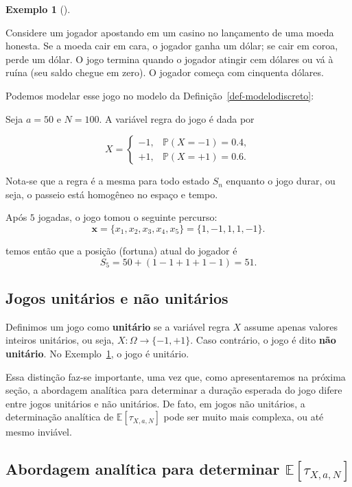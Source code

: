 \documentclass[
  brazilian,
  12pt,
]{article}
\theoremstyle{definition}
\newtheorem{example}{Exemplo}[section]
\theoremstyle{definition}
\theoremstyle{remark}
\begin{document}
\begin{example}[]\protect\hypertarget{exm-modelodiscreto}{}\label{exm-modelodiscreto}

Considere um jogador apostando em um casino no lançamento de uma moeda
honesta. Se a moeda cair em cara, o jogador ganha um dólar; se cair em
coroa, perde um dólar. O jogo termina quando o jogador atingir cem
dólares ou vá à ruína (seu saldo chegue em zero). O jogador começa com
cinquenta dólares.

Podemos modelar esse jogo no modelo da
Definição~\ref{def-modelodiscreto}:

Seja \(a = 50\) e \(N = 100\). A variável regra do jogo é dada por

\[
X = \begin{cases}
-1, & \mathbb{P}(X = -1) = 0.4, \\
+1, & \mathbb{P}(X = +1) = 0.6.
\end{cases}
\]

Nota-se que a regra é a mesma para todo estado \(S_n\) enquanto o jogo
durar, ou seja, o passeio está homogêneo no espaço e tempo.

Após \(5\) jogadas, o jogo tomou o seguinte percurso: \[
\pmb{x} = \{x_1, x_2, x_3, x_4, x_5\} = \{1, -1, 1, 1, -1\}.
\]

temos então que a posição (fortuna) atual do jogador é \[
S_5 = 50 + (1 - 1 + 1 + 1 -1) = 51.
\]

\end{example}

\subsection{Jogos unitários e não
unitários}\label{jogos-unituxe1rios-e-nuxe3o-unituxe1rios}

Definimos um jogo como \textbf{unitário} se a variável regra \(X\)
assume apenas valores inteiros unitários, ou seja,
\(X: \Omega \rightarrow \{-1, +1\}\). Caso contrário, o jogo é dito
\textbf{não unitário}. No Exemplo~\ref{exm-modelodiscreto}, o jogo é
unitário.

Essa distinção faz-se importante, uma vez que, como apresentaremos na
próxima seção, a abordagem analítica para determinar a duração esperada
do jogo difere entre jogos unitários e não unitários. De fato, em jogos
não unitários, a determinação analítica de
\(\mathbb{E}[\tau_{X, a, N}]\) pode ser muito mais complexa, ou até
mesmo inviável.

\subsection{\texorpdfstring{Abordagem analítica para determinar
\(\mathbb{E}[\tau_{X, a, N}]\)}{Abordagem analítica para determinar \textbackslash mathbb\{E\}{[}\textbackslash tau\_\{X, a, N\}{]}}}\label{sec-anali}
\end{document}
